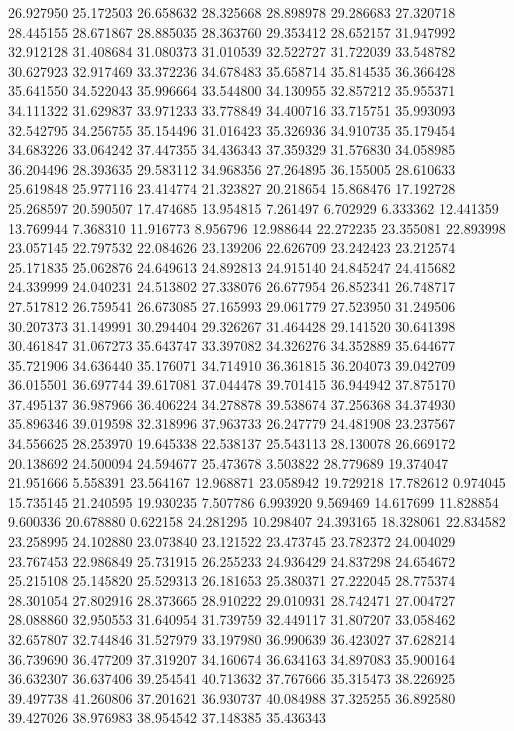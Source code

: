 26.927950
25.172503
26.658632
28.325668
28.898978
29.286683
27.320718
28.445155
28.671867
28.885035
28.363760
29.353412
28.652157
31.947992
32.912128
31.408684
31.080373
31.010539
32.522727
31.722039
33.548782
30.627923
32.917469
33.372236
34.678483
35.658714
35.814535
36.366428
35.641550
34.522043
35.996664
33.544800
34.130955
32.857212
35.955371
34.111322
31.629837
33.971233
33.778849
34.400716
33.715751
35.993093
32.542795
34.256755
35.154496
31.016423
35.326936
34.910735
35.179454
34.683226
33.064242
37.447355
34.436343
37.359329
31.576830
34.058985
36.204496
28.393635
29.583112
34.968356
27.264895
36.155005
28.610633
25.619848
25.977116
23.414774
21.323827
20.218654
15.868476
17.192728
25.268597
20.590507
17.474685
13.954815
7.261497
6.702929
6.333362
12.441359
13.769944
7.368310
11.916773
8.956796
12.988644
22.272235
23.355081
22.893998
23.057145
22.797532
22.084626
23.139206
22.626709
23.242423
23.212574
25.171835
25.062876
24.649613
24.892813
24.915140
24.845247
24.415682
24.339999
24.040231
24.513802
27.338076
26.677954
26.852341
26.748717
27.517812
26.759541
26.673085
27.165993
29.061779
27.523950
31.249506
30.207373
31.149991
30.294404
29.326267
31.464428
29.141520
30.641398
30.461847
31.067273
35.643747
33.397082
34.326276
34.352889
35.644677
35.721906
34.636440
35.176071
34.714910
36.361815
36.204073
39.042709
36.015501
36.697744
39.617081
37.044478
39.701415
36.944942
37.875170
37.495137
36.987966
36.406224
34.278878
39.538674
37.256368
34.374930
35.896346
39.019598
32.318996
37.963733
26.247779
24.481908
23.237567
34.556625
28.253970
19.645338
22.538137
25.543113
28.130078
26.669172
20.138692
24.500094
24.594677
25.473678
3.503822
28.779689
19.374047
21.951666
5.558391
23.564167
12.968871
23.058942
19.729218
17.782612
0.974045
15.735145
21.240595
19.930235
7.507786
6.993920
9.569469
14.617699
11.828854
9.600336
20.678880
0.622158
24.281295
10.298407
24.393165
18.328061
22.834582
23.258995
24.102880
23.073840
23.121522
23.473745
23.782372
24.004029
23.767453
22.986849
25.731915
26.255233
24.936429
24.837298
24.654672
25.215108
25.145820
25.529313
26.181653
25.380371
27.222045
28.775374
28.301054
27.802916
28.373665
28.910222
29.010931
28.742471
27.004727
28.088860
32.950553
31.640954
31.739759
32.449117
31.807207
33.058462
32.657807
32.744846
31.527979
33.197980
36.990639
36.423027
37.628214
36.739690
36.477209
37.319207
34.160674
36.634163
34.897083
35.900164
36.632307
36.637406
39.254541
40.713632
37.767666
35.315473
38.226925
39.497738
41.260806
37.201621
36.930737
40.084988
37.325255
36.892580
39.427026
38.976983
38.954542
37.148385
35.436343
